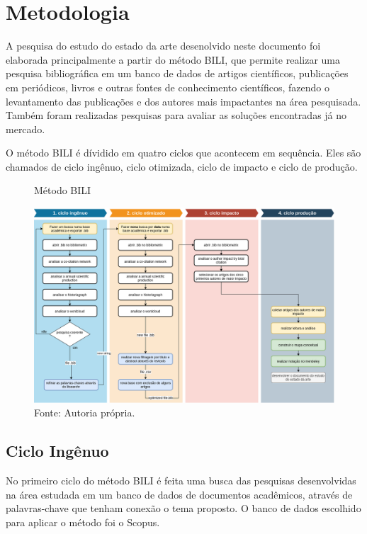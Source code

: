 \chapter{Metodologia}
\label{chap:metodologia}
A pesquisa do estudo do estado da arte desenolvido neste documento foi elaborada principalmente a partir do método BILI, que permite realizar uma pesquisa bibliográfica em um banco de dados de artigos científicos, publicações em periódicos, livros e outras fontes de conhecimento científicos, fazendo o levantamento das publicações e dos autores mais impactantes na área pesquisada. Também foram realizadas pesquisas para avaliar as soluções encontradas já no mercado.

O método BILI é dívidido em quatro ciclos que acontecem em sequência. Eles são chamados de ciclo ingênuo, ciclo otimizada, ciclo de impacto e ciclo de produção.



\begin{figure} [h!]	
  \centering
  \caption{Método BILI}
  \includegraphics[width=1\textwidth]{Figures/bili.png}
  \caption*{Fonte: Autoria própria.}
  \label{fig:QFD}
\end{figure}

\section{Ciclo Ingênuo}
No primeiro ciclo do método BILI é feita uma busca das pesquisas desenvolvidas na área estudada em um banco de dados de documentos acadêmicos, através de palavras-chave que tenham conexão o tema proposto. O banco de dados escolhido para aplicar o método foi o Scopus.

